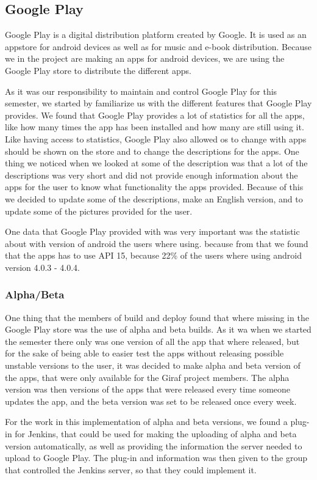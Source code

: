 \subsection{Google Play}
Google Play is a digital distribution platform created by Google. It is used as an appstore for android devices as well as for music and e-book distribution. Because we in the project are making an apps for android devices, we are using the Google Play store to distribute the different apps. 

As it was our responsibility to maintain and control Google Play for this semester, we started by familiarize us with the different features that Google Play provides. We found that Google Play provides a lot of statistics for all the apps, like how many times the app has been installed and how many are still using it. Like having access to statistics, Google Play also allowed os to change with apps should be shown on the store and to change the descriptions for the apps. One thing we noticed when we looked at some of the description was that a lot of the descriptions was very short and did not provide enough information about the apps for the user to know what functionality the apps provided. Because of this we decided to update some of the descriptions, make an English version, and to update some of the pictures provided for the user.

One data that Google Play provided with was very important was the statistic about with version of android the users where using. because from that we found that the apps has to use API 15, because 22\% of the users where using android version 4.0.3 - 4.0.4. 

\subsubsection{Alpha/Beta}
One thing that the members of build and deploy found that where missing in the Google Play store was the use of alpha and beta builds. As it wa when we started the semester there only was one version of all the app that where released, but for the sake of being able to easier test the apps without releasing possible unstable versions to the user, it was decided to make alpha and beta version of the apps, that were only available for the Giraf project members. The alpha version was then versions of the apps that were released every time someone updates the app, and the beta version was set to be released once every week. 

For the work in this implementation of alpha and beta versions, we found a plug-in for Jenkins, that could be used for making the uploading of alpha and beta version automatically, as well as providing the information the server needed to upload to Google Play. The plug-in and information was then given to the group that controlled the Jenkins server, so that they could implement it. 